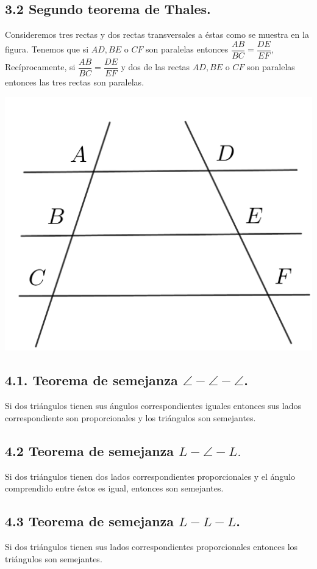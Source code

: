 \documentclass[12pt,a4paper]{article}
\begin{document}
\subsection*{3.2 Segundo teorema de Thales.}
Consideremos tres rectas y dos rectas transversales a éstas como se muestra en la figura. Tenemos que si $AD, BE$ o $CF$ son paralelas entonces $\dfrac{AB}{BC}=\dfrac{DE}{EF}$, Recíprocamente, si $\dfrac{AB}{BC}=\dfrac{DE}{EF}$ y dos de las rectas $AD, BE$ o $CF$ son paralelas entonces las tres rectas son paralelas.
\begin{center}
\includegraphics[scale=0.45]{thales.png}
\end{center} 
\newpage
\subsection*{4.1. Teorema de semejanza $\angle -\angle -\angle$.}
Si dos triángulos tienen sus ángulos correspondientes iguales entonces sus lados correspondiente son proporcionales y los triángulos son semejantes.
\subsection*{4.2 Teorema de semejanza $L-\angle - L.$}
Si dos triángulos tienen dos lados correspondientes proporcionales y el ángulo comprendido entre éstos es igual, entonces son semejantes.
\subsection*{4.3 Teorema de semejanza $L-L-L$.}
Si dos triángulos tienen sus lados correspondientes proporcionales entonces los triángulos son semejantes.
\end{document}
